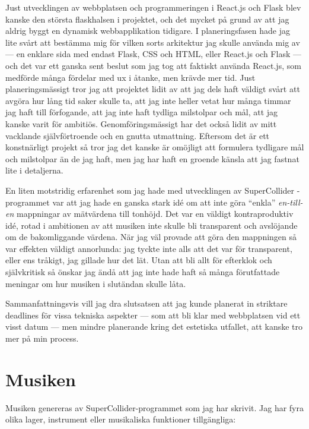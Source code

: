 \documentclass[11pt, a4paper]{article} %
\begin{document}
Just utvecklingen av webbplatsen och programmeringen i React.js och Flask blev kanske den största flaskhalsen i projektet, och det mycket på grund av att jag aldrig byggt en dynamisk webbapplikation tidigare. I planeringsfasen hade jag lite svårt att bestämma mig för vilken sorts arkitektur jag skulle använda mig av --- en enklare sida med endast Flask, CSS och HTML, eller React.js och Flask --- och det var ett ganska sent beslut som jag tog att faktiskt använda React.js, som medförde många fördelar med \gls{ux} i åtanke, men krävde mer tid. Just planeringsmässigt tror jag att projektet lidit av att jag dels haft väldigt svårt att avgöra hur lång tid saker skulle ta, att jag inte heller vetat hur många timmar jag haft till förfogande, att jag inte haft tydliga milstolpar och mål, att jag kanske varit för ambitiös. Genomföringsmässigt har det också lidit av mitt vacklande självförtroende och en gnutta utmattning. Eftersom det är ett konstnärligt projekt så tror jag det kanske är omöjligt att formulera tydligare mål och milstolpar än de jag haft, men jag har haft en groende känsla att jag fastnat lite i detaljerna. 

En liten motstridig erfarenhet som jag hade med utvecklingen av SuperCollider -programmet var att jag hade en ganska stark idé om att inte göra ``enkla'' \emph{en-till-en} mappningar av mätvärdena till tonhöjd. Det var en väldigt kontraproduktiv idé, rotad i ambitionen av att musiken inte skulle bli transparent och avslöjande om de bakomliggande värdena. När jag väl provade att göra den mappningen så var effekten väldigt annorlunda: jag tyckte inte alls att det var för transparent, eller ens tråkigt, jag gillade hur det lät. Utan att bli allt för efterklok och självkritisk så önskar jag ändå att jag inte hade haft så många förutfattade meningar om hur musiken i slutändan skulle låta.

Sammanfattningsvis vill jag dra slutsatsen att jag kunde planerat in striktare deadlines för vissa tekniska aspekter --- som att bli klar med webbplatsen vid ett visst datum --- men mindre planerande kring det estetiska utfallet, att kanske tro mer på min process.

\section*{Musiken}

Musiken genereras av SuperCollider-programmet som jag har skrivit. Jag har fyra olika lager, instrument eller musikaliska funktioner tillgängliga:
\end{document}
